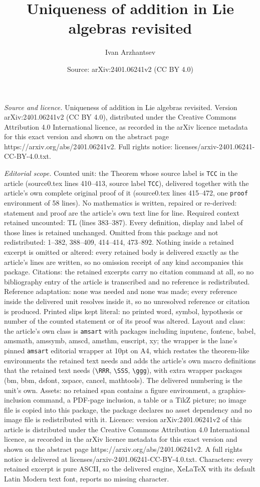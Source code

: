 \documentclass[10pt,a4paper]{amsart}
\title[Uniqueness of addition in Lie algebras revisited]{Uniqueness of addition in Lie algebras revisited}
\author{Ivan Arzhantsev}
\date{Source: arXiv:2401.06241v2 (CC BY 4.0)}
\begin{document}
\maketitle

\noindent\emph{Source and licence.} Uniqueness of addition in Lie algebras revisited. Version arXiv:2401.06241v2 (CC BY 4.0), distributed under the Creative Commons Attribution 4.0 International licence, as recorded in the arXiv licence metadata for this exact version and shown on the abstract page https://arxiv.org/abs/2401.06241v2. Full rights notice: licenses/arxiv-2401.06241-CC-BY-4.0.txt.\par\smallskip

\noindent\textit{Editorial scope.} Counted unit: the Theorem whose source label is \texttt{TCC} in the article (source0.tex lines 410--413, source label \texttt{TCC}), delivered together with the article's own complete original proof of it (source0.tex lines 415--472, one \texttt{proof} environment of 58 lines). No mathematics is written, repaired or re-derived: statement and proof are the article's own text line for line. Required context retained uncounted: TL (lines 383--387). Every definition, display and label of those lines is retained unchanged. Omitted from this package and not redistributed: 1--382, 388--409, 414--414, 473--892. Nothing inside a retained excerpt is omitted or altered: every retained body is delivered exactly as the article's lines are written, so no omission receipt of any kind accompanies this package. Citations: the retained excerpts carry no citation command at all, so no bibliography entry of the article is transcribed and no reference is redistributed. Reference adaptation: none was needed and none was made; every reference inside the delivered unit resolves inside it, so no unresolved reference or citation is produced. Printed slips kept literal: no printed word, symbol, hypothesis or number of the counted statement or of its proof was altered. Layout and class: the article's own class is \texttt{amsart} with packages including inputenc, fontenc, babel, amsmath, amssymb, amscd, amsthm, euscript, xy; the wrapper is the lane's pinned \texttt{amsart} editorial wrapper at 10pt on A4, which restates the theorem-like environments the retained text needs and adds the article's own macro definitions that the retained text needs (\texttt{\textbackslash RRR}, \texttt{\textbackslash SSS}, \texttt{\textbackslash ggg}), with extra wrapper packages (bm, bbm, dsfont, xspace, cancel, mathtools). The delivered numbering is the unit's own. Assets: no retained span contains a figure environment, a graphics-inclusion command, a PDF-page inclusion, a table or a TikZ picture; no image file is copied into this package, the package declares no asset dependency and no image file is redistributed with it. Licence: version arXiv:2401.06241v2 of this article is distributed under the Creative Commons Attribution 4.0 International licence, as recorded in the arXiv licence metadata for this exact version and shown on the abstract page https://arxiv.org/abs/2401.06241v2. A full rights notice is delivered at licenses/arxiv-2401.06241-CC-BY-4.0.txt. Characters: every retained excerpt is pure ASCII, so the delivered engine, XeLaTeX with its default Latin Modern text font, reports no missing character.
\end{document}
